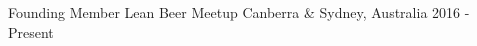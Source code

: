 \begin{cventries}
\vspace{-7.5mm}


\cventry
{Founding Member} %
{Lean Beer Meetup} %
{Canberra \& Sydney, Australia} %
{2016 - Present} %
{ %
\begin{cvitems}
\end{cvitems}
}
{}

\vspace{-7.5mm}


\end{cventries}
